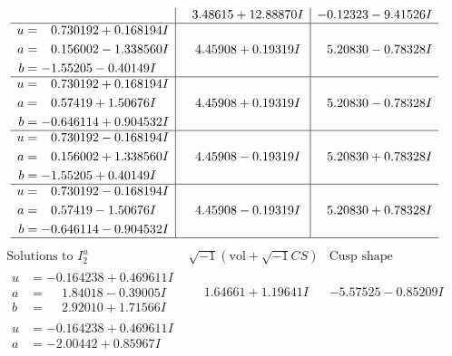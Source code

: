 \documentclass[1p]{elsarticle_modified}
\theoremstyle{definition}
\newcommand{\I}{\sqrt{-1}}
\begin{document}
$$\begin{array}{c|c|c}
 & \phantom{-}3.48615 + 12.88870 I & -0.12323 - 9.41526 I \\ \hline\begin{aligned}
u &= \phantom{-}0.730192 + 0.168194 I \\
a &= \phantom{-}0.156002 - 1.338560 I \\
b &= -1.55205 - 0.40149 I\end{aligned}
 & \phantom{-}4.45908 + 0.19319 I & \phantom{-}5.20830 - 0.78328 I \\ \hline\begin{aligned}
u &= \phantom{-}0.730192 + 0.168194 I \\
a &= \phantom{-}0.57419 + 1.50676 I \\
b &= -0.646114 + 0.904532 I\end{aligned}
 & \phantom{-}4.45908 + 0.19319 I & \phantom{-}5.20830 - 0.78328 I \\ \hline\begin{aligned}
u &= \phantom{-}0.730192 - 0.168194 I \\
a &= \phantom{-}0.156002 + 1.338560 I \\
b &= -1.55205 + 0.40149 I\end{aligned}
 & \phantom{-}4.45908 - 0.19319 I & \phantom{-}5.20830 + 0.78328 I \\ \hline\begin{aligned}
u &= \phantom{-}0.730192 - 0.168194 I \\
a &= \phantom{-}0.57419 - 1.50676 I \\
b &= -0.646114 - 0.904532 I\end{aligned}
 & \phantom{-}4.45908 - 0.19319 I & \phantom{-}5.20830 + 0.78328 I\\
 \hline 
 \end{array}$$\newpage$$\begin{array}{c|c|c}  
\text{Solutions to }I^u_{2}& \I (\text{vol} + \sqrt{-1}CS) & \text{Cusp shape}\\
 \hline 
\begin{aligned}
u &= -0.164238 + 0.469611 I \\
a &= \phantom{-}1.84018 - 0.39005 I \\
b &= \phantom{-}2.92010 + 1.71566 I\end{aligned}
 & \phantom{-}1.64661 + 1.19641 I & -5.57525 - 0.85209 I \\ \hline\begin{aligned}
u &= -0.164238 + 0.469611 I \\
a &= -2.00442 + 0.85967 I \\

\end{aligned}
\end{array}$$
\end{document}
